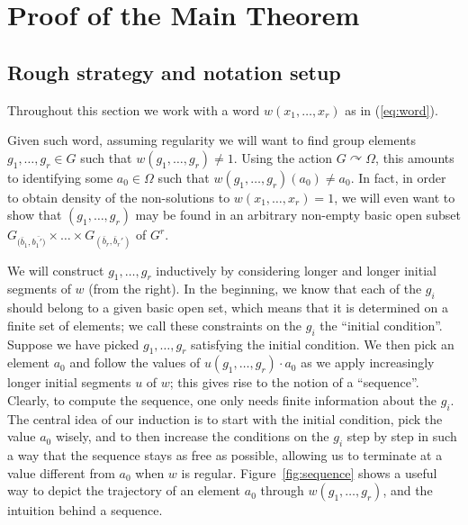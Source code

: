 \documentclass{article}
\theoremstyle{remark}
\theoremstyle{definition}
\def\acts{\curvearrowright}
\begin{document}
{\section{Proof of the Main Theorem}\label{sect:proof}

\subsection{Rough strategy and notation setup}
Throughout this section we work with a %
 {word} $w(x_1,\ldots,x_r)$ as in (\ref{eq:word}). 

Given such word, assuming regularity we will want to find group elements 
$g_1,\dots,  g_r\in G$ such that $w(g_1, \dots, g_r)\neq 1$. %
{Using the action $G\acts\Omega$,} 
this amounts to identifying  some $a_0\in\Omega$ such that $w(g_1, \dots, g_r)(a_0)\neq a_0$. In fact, {in order to obtain density %
of the non-solutions to $w(x_1,\ldots,x_r)=1$}, we will even want to show that $(g_1, \dots, g_r)$ may be found in an arbitrary non-empty basic open subset $G_{(\bar{b}_1, \bar{b_1')}}\times\dots\times  G_{(\bar{b}_r, \bar{b}_r')}$ of $G^r$. 

We will construct $g_1,\ldots,g_r$ inductively by considering longer and longer initial segments of $w$ (from the right). In the beginning, we know that each of the $g_i$ should belong to a given basic open set, which means that it is  determined on a finite set of elements; we call these constraints on the $g_i$ the   ``initial condition''. Suppose we have picked $g_1,\ldots,g_r$ satisfying the initial condition. We then pick an element $a_0$ and follow the values of $u(g_1, \dots, g_r)\cdot a_0$ as we apply increasingly longer initial segments $u$ of $w$; 
this gives rise to the notion of a ``sequence''. Clearly, to compute the sequence, one only needs finite information about the $g_i$. The central idea of our induction is to start with the initial condition, pick the value $a_0$ wisely, and to then increase the conditions on the $g_i$ step by step in such a way that the sequence stays as free as possible, allowing us to terminate  at a value different from $a_0$  when $w$ is regular.  
Figure~\ref{fig:sequence} shows a useful way to depict the trajectory of an element $a_0$ through $w(g_1,\ldots,g_r)$, and the intuition behind a sequence.

}
\end{document}
